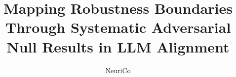 \documentclass{article}
\title{Mapping Robustness Boundaries Through Systematic Adversarial Null Results in LLM Alignment}
\author{NeuriCo}
\begin{document}
\maketitle

\begin{abstract}

\end{abstract}









\end{document}
